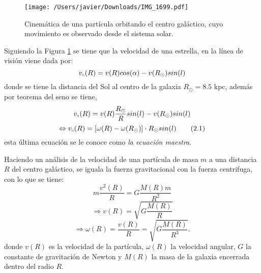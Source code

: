 \documentclass[letterpaper,oneside]{article}
\begin{document}



\begin{figure}[H]
    \centering
    \texttt{[image: /Users/javier/Downloads/IMG\_1699.pdf]}
    \caption{Cinemática de una partícula orbitando el centro galáctico, cuyo movimiento es observado desde el sistema solar.}
    \label{fig:mecanica}
\end{figure}

Siguiendo la Figura \ref{fig:mecanica} se tiene que la velocidad de una estrella, en la línea de visión viene dada por:
\begin{equation*}
v_{\shortparallel}(R)=v(R)cos(\alpha)-v(R_{\odot})sin(l)
\end{equation*}
donde se tiene la distancia del Sol al centro de la galaxia $R_{\odot}=8.5$ kpc, además por teorema del seno se tiene,
\begin{equation*}
v_{\shortparallel}(R)=v(R)\frac{R_{\odot}}{R}sin(l)-v(R_{\odot})sin(l)\\
\end{equation*}
\[
\Leftrightarrow v_{\shortparallel}(R)=[\omega(R)-\omega(R_{\odot})]	\cdot R_{\odot}sin(l) \tag{2.1} \label{eq:ec-maestra}
\]
esta última ecuación se le conoce como \textit{la ecuación maestra}.

Haciendo un análisis de la velocidad de una partícula de masa $m$ a una distancia $R$ del centro galáctico, se iguala la fuerza gravitacional con la fuerza centrifuga, con lo que se tiene:
\[
m\frac{v^2(R)}{R}=G\frac{M(R)m}{R^2}
\]
\[
 \Rightarrow v(R)=\sqrt{G\frac{M(R)}{R}} \tag{2.2} \label{eq:velocidad}
\]
\[
 \Rightarrow \omega(R)=\frac{v(R)}{R}=\sqrt{G\frac{M(R)}{R^3}}.  \tag{2.3} \label{eq:omega}
\]
donde $v(R)$ es la velocidad de la partícula, $\omega(R)$ la velocidad angular, $G$ la constante de gravitación de Newton y $M(R)$ la masa de la galaxia encerrada dentro del radio $R$.
\end{document}
